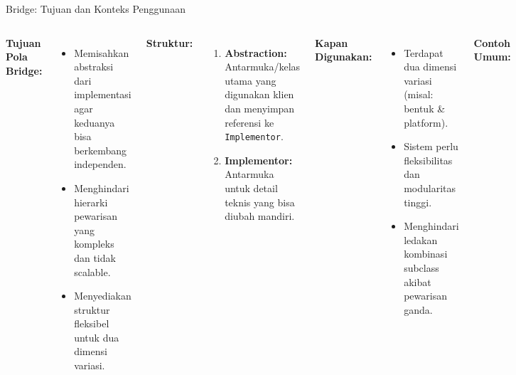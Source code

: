 \documentclass[aspectratio=169, table]{beamer}
\begin{document}
\begin{frame}[fragile]{Bridge: Tujuan dan Konteks Penggunaan}
	\vspace{20pt}
	\begin{columns}[T]
		\textbf{Tujuan Pola Bridge:}
		\begin{itemize}
			\item Memisahkan abstraksi dari implementasi agar keduanya bisa berkembang independen.
			\item Menghindari hierarki pewarisan yang kompleks dan tidak scalable.
			\item Menyediakan struktur fleksibel untuk dua dimensi variasi.
		\end{itemize}
		
		\textbf{Struktur:}
		\begin{enumerate}
			\item \textbf{Abstraction:} Antarmuka/kelas utama yang digunakan klien dan menyimpan referensi ke \texttt{Implementor}.
			\item \textbf{Implementor:} Antarmuka untuk detail teknis yang bisa diubah mandiri.
		\end{enumerate}
		
		\textbf{Kapan Digunakan:}
		\begin{itemize}
			\item Terdapat dua dimensi variasi (misal: bentuk \& platform).
			\item Sistem perlu fleksibilitas dan modularitas tinggi.
			\item Menghindari ledakan kombinasi subclass akibat pewarisan ganda.
		\end{itemize}
		
		\textbf{Contoh Umum:}
		\begin{itemize}
			\item Rendering bentuk di OpenGL vs HTML Canvas.
			\item Format dokumen (PDF, DOCX) vs metode penyimpanan.
			\item Aplikasi UI lintas sistem operasi.
		\end{itemize}
	\end{columns}
\end{frame}
\end{document}
